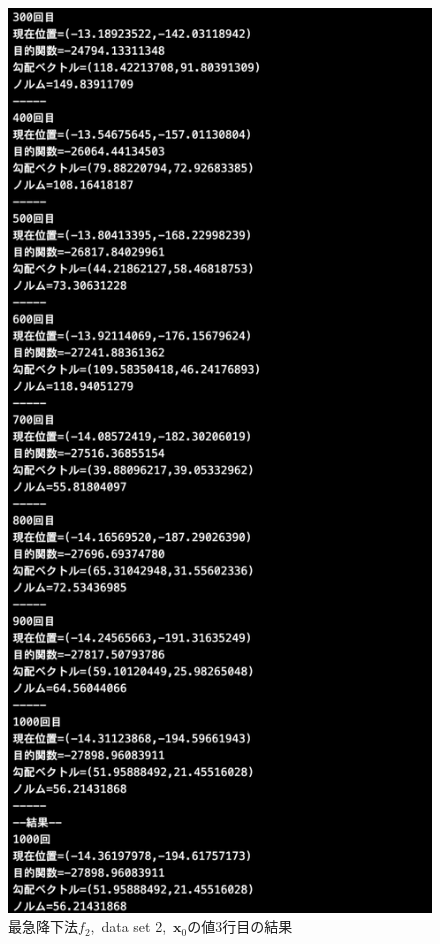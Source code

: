 \documentclass[12pt]{jarticle}
\begin{document}
\begin{figure}[h]
\begin{minipage}{0.5\hsize}
    \end{minipage}
    \begin{minipage}{0.5\hsize}
        \begin{center}
            \includegraphics[scale=0.2]{kadai1_2s_out2_3_3.png}
        \end{center}
    \end{minipage}
    \caption{最急降下法$f_2$,\ data set 2,\ $\boldsymbol{x}_0$の値3行目の結果}
\end{figure}
\end{document}
